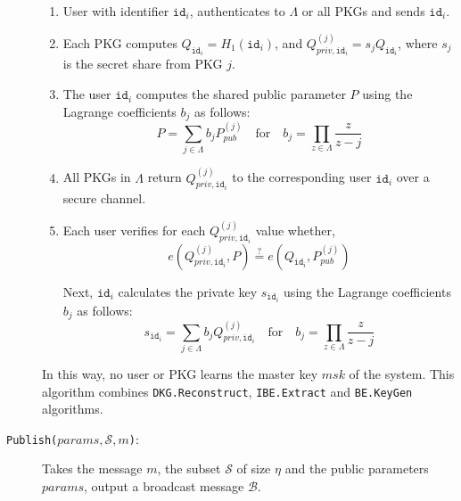 \documentclass{llncs}
\newcommand{\id}[1]{\ensuremath{\mathtt{id}_{#1}}}
\begin{document}
\begin{description}
    \begin{enumerate}
        \item User with identifier \id{i}, authenticates to $\Lambda$ or all PKGs and sends \id{i}.
        \item Each PKG computes $Q_{\id{i}} = H_1 \left( \id{i} \right)$, and $Q_{priv,\id{i}}^{(j)} = s_j Q_{\id{i}}$, where $s_j$ is the secret share from PKG $j$.
        \item The user $\id{i}$ computes the shared public parameter $P$ using the Lagrange coefficients $b_j$ as follows:
        \begin{equation*}
         P = \sum_{j \in \Lambda} b_j P_{pub}^{\left( j \right)} \quad \textrm{for} \quad b_j = \prod_{z \in \Lambda} \frac{z}{z-j}
        \end{equation*}
        \item All PKGs in $\Lambda$ return $Q_{priv,\id{i}}^{(j)}$ to the corresponding user $\id{i}$ over a secure channel.
        \item Each user verifies for each $Q_{priv,\id{i}}^{(j)}$ value whether, 
        \begin{equation*}
            e \left( Q_{priv , \id{i} }^{(j)}, P \right ) \stackrel{?}{=} e \left( Q_{\id{i}}, P_{pub}^{(j)} \right)
        \end{equation*}
        
        Next, $\id{i}$ calculates the private key $s_{\id{i}}$ using the Lagrange coefficients $b_j$ as follows: 
        \begin{equation*}
            s_{\id{i}} = \sum\limits_{j\in\Lambda} b_j Q_{priv,\id{i}}^{(j)} \quad \textrm{for} \quad b_j = \prod_{z\in \Lambda} \frac{z}{z-j}
        \end{equation*}
        \end{enumerate}
        In this way, no user or PKG learns the master key $msk$ of the system. This algorithm combines \texttt{DKG.Reconstruct}, \texttt{IBE.Extract} and \texttt{BE.KeyGen} algorithms.
        \bigskip
\item[\texttt{Publish($params, \mathcal{S}, m$)}:] Takes the message $m$, the subset $\mathcal{S}$ of size $\eta$ and the public parameters $params$, output a broadcast message $\mathcal{B}$.


\end{description}
\end{document}
